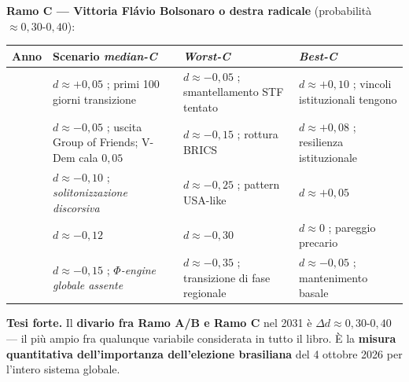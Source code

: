 \textbf{Ramo C --- Vittoria Flávio Bolsonaro o destra radicale}
(probabilità \(\approx 0{,}30\)-\(0{,}40\)):

{\def\LTcaptype{none} %
{\small\begin{longtable}[]{@{}
  >{\raggedright\arraybackslash}p{}
  >{\raggedright\arraybackslash}p{}
  >{\raggedright\arraybackslash}p{}
  >{\raggedright\arraybackslash}p{}@{}}
\toprule\noalign{}
\begin{minipage}[b]{\linewidth}\raggedright
Anno
\end{minipage} & \begin{minipage}[b]{\linewidth}\raggedright
Scenario \emph{median-C}
\end{minipage} & \begin{minipage}[b]{\linewidth}\raggedright
\emph{Worst-C}
\end{minipage} & \begin{minipage}[b]{\linewidth}\raggedright
\emph{Best-C}
\end{minipage} \\
\midrule\noalign{}
\endhead
\bottomrule\noalign{}
\endlastfoot
2027 & \(d \approx +0{,}05\) ; primi 100 giorni transizione &
\(d \approx -0{,}05\) ; smantellamento STF tentato &
\(d \approx +0{,}10\) ; vincoli istituzionali tengono \\
2028 & \(d \approx -0{,}05\) ; uscita Group of Friends; V-Dem cala
\(0{,}05\) & \(d \approx -0{,}15\) ; rottura BRICS &
\(d \approx +0{,}08\) ; resilienza istituzionale \\
2029 & \(d \approx -0{,}10\) ; \emph{solitonizzazione discorsiva} &
\(d \approx -0{,}25\) ; pattern USA-like & \(d \approx +0{,}05\) \\
2030 & \(d \approx -0{,}12\) & \(d \approx -0{,}30\) & \(d \approx 0\) ;
pareggio precario \\
2031 & \(d \approx -0{,}15\) ; \emph{$\Phi$-engine globale assente} &
\(d \approx -0{,}35\) ; transizione di fase regionale &
\(d \approx -0{,}05\) ; mantenimento basale \\
\end{longtable}}
}

\Hypoth{} \textbf{Tesi forte.} Il \textbf{divario fra Ramo A/B e Ramo C}
nel 2031 è \(\Delta d \approx 0{,}30\)-\(0{,}40\) --- il più ampio fra
qualunque variabile considerata in tutto il libro. È la \textbf{misura
quantitativa dell'importanza dell'elezione brasiliana} del 4 ottobre
2026 per l'intero sistema globale.



